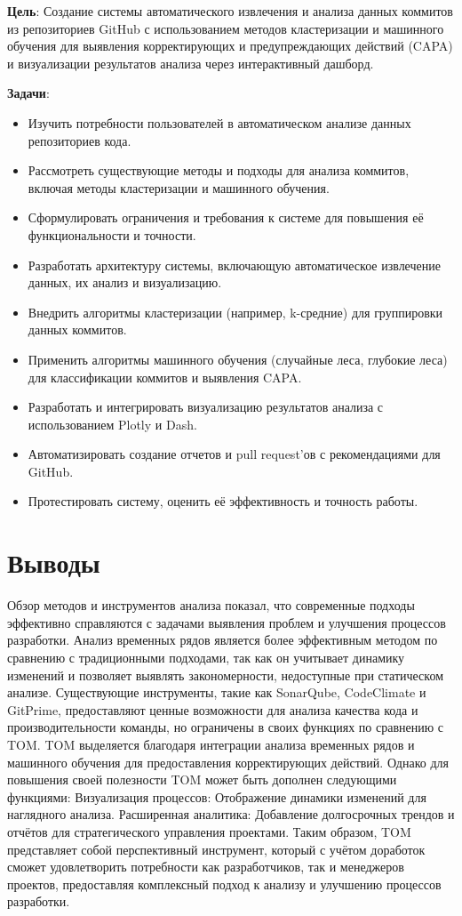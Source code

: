 \textbf{Цель}: Создание системы автоматического извлечения и анализа данных коммитов из репозиториев GitHub с использованием методов кластеризации и машинного обучения для выявления корректирующих и предупреждающих действий (CAPA) и визуализации результатов анализа через интерактивный дашборд.

\textbf{Задачи}:
\begin{itemize}
	\item Изучить потребности пользователей в автоматическом анализе данных репозиториев кода.
	\item Рассмотреть существующие методы и подходы для анализа коммитов, включая методы кластеризации и машинного обучения.
	\item Сформулировать ограничения и требования к системе для повышения её функциональности и точности.
	\item Разработать архитектуру системы, включающую автоматическое извлечение данных, их анализ и визуализацию.
	\item Внедрить алгоритмы кластеризации (например, k-средние) для группировки данных коммитов.
	\item Применить алгоритмы машинного обучения (случайные леса, глубокие леса) для классификации коммитов и выявления CAPA.
	\item Разработать и интегрировать визуализацию результатов анализа с использованием Plotly и Dash.
	\item Автоматизировать создание отчетов и pull request'ов с рекомендациями для GitHub.
	\item Протестировать систему, оценить её эффективность и точность работы.
\end{itemize}

\section{Выводы} \label{ch1:conclusion}

Обзор методов и инструментов анализа показал, что современные подходы эффективно справляются с задачами выявления проблем и улучшения процессов разработки. Анализ временных рядов является более эффективным методом по сравнению с традиционными подходами, так как он учитывает динамику изменений и позволяет выявлять закономерности, недоступные при статическом анализе. Существующие инструменты, такие как SonarQube, CodeClimate и GitPrime, предоставляют ценные возможности для анализа качества кода и производительности команды, но ограничены в своих функциях по сравнению с TOM. TOM выделяется благодаря интеграции анализа временных рядов и машинного обучения для предоставления корректирующих действий.
Однако для повышения своей полезности TOM может быть дополнен следующими функциями:
Визуализация процессов: Отображение динамики изменений для наглядного анализа.
Расширенная аналитика: Добавление долгосрочных трендов и отчётов для стратегического управления проектами.
Таким образом, TOM представляет собой перспективный инструмент, который с учётом доработок сможет удовлетворить потребности как разработчиков, так и менеджеров проектов, предоставляя комплексный подход к анализу и улучшению процессов разработки.
